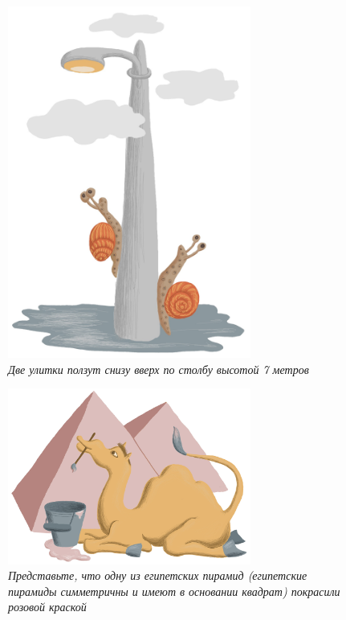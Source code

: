\documentclass[10pt]{scrbook} \usepackage{modules/nonstahp_book}
\begin{document}
\begin{figure} \begin{center}
	\includegraphics[width=8cm]{figures/color/07c.jpg}
	\vspace{1cm}
	\caption{
             {\itshape  Две улитки ползут снизу вверх по столбу высотой 7 метров }\medskip\\
             }
\end{center} \end{figure}

\begin{figure} \begin{center}
	\includegraphics[width=8cm]{figures/color/19c.jpg}
	\vspace{0.5cm}
	\caption{
             {\itshape  Представьте, что одну из египетских пирамид 
             (египетские пирамиды симметричны и имеют в основании квадрат) 
             покрасили розовой краской }\\
             }
\end{center} \end{figure}
\end{document}
